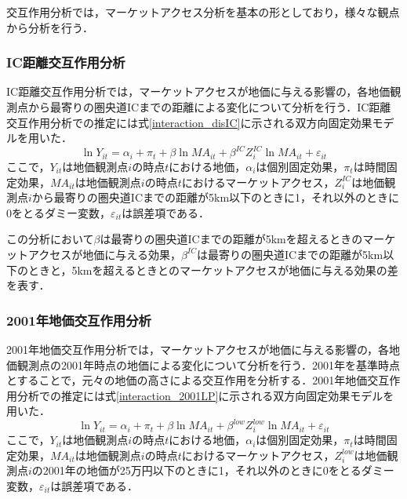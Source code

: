 交互作用分析では，マーケットアクセス分析を基本の形としており，様々な観点から分析を行う．
\subsubsection{IC距離交互作用分析}
IC距離交互作用分析では，マーケットアクセスが地価に与える影響の，各地価観測点から最寄りの圏央道ICまでの距離による変化について分析を行う．IC距離交互作用分析での推定には式\ref{interaction_disIC}に示される双方向固定効果モデルを用いた．
\begin{equation}
  \ln{Y_{it}} = \alpha_{i} + \pi_{t} + \beta\ln{MA_{it}} + \beta^{IC}Z^{IC}_{i}\ln{MA_{it}} + \varepsilon_{it}
  \label{interaction_disIC}
\end{equation}
ここで，$Y_{it}$は地価観測点$i$の時点$t$における地価，$\alpha_{i}$は個別固定効果，$\pi_{t}$は時間固定効果，$MA_{it}$は地価観測点$i$の時点$t$におけるマーケットアクセス，$Z^{IC}_{i}$は地価観測点$i$から最寄りの圏央道ICまでの距離が5km以下のときに1，それ以外のときに0をとるダミー変数，$\varepsilon_{it}$は誤差項である．

この分析において$\beta$は最寄りの圏央道ICまでの距離が5kmを超えるときのマーケットアクセスが地価に与える効果，$\beta^{IC}$は最寄りの圏央道ICまでの距離が5km以下のときと，5kmを超えるときとのマーケットアクセスが地価に与える効果の差を表す．
\subsubsection{2001年地価交互作用分析}
2001年地価交互作用分析では，マーケットアクセスが地価に与える影響の，各地価観測点の2001年時点の地価による変化について分析を行う．2001年を基準時点とすることで，元々の地価の高さによる交互作用を分析する．2001年地価交互作用分析での推定には式\ref{interaction_2001LP}に示される双方向固定効果モデルを用いた．
\begin{equation}
  \ln{Y_{it}} = \alpha_{i} + \pi_{t} + \beta\ln{MA_{it}} + \beta^{low}Z^{low}_{i}\ln{MA_{it}} + \varepsilon_{it}
  \label{interaction_2001LP}
\end{equation}
ここで，$Y_{it}$は地価観測点$i$の時点$t$における地価，$\alpha_{i}$は個別固定効果，$\pi_{t}$は時間固定効果，$MA_{it}$は地価観測点$i$の時点$t$におけるマーケットアクセス，$Z^{low}_{i}$は地価観測点$i$の2001年の地価が25万円以下のときに1，それ以外のときに0をとるダミー変数，$\varepsilon_{it}$は誤差項である．

